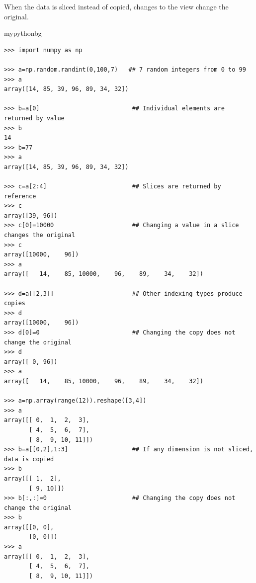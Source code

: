 When the data is sliced instead of copied,
changes to the view change the original.
\begin{tsession}{mypythonbg}
\begin{verbatim}
>>> import numpy as np

>>> a=np.random.randint(0,100,7)   ## 7 random integers from 0 to 99
>>> a
array([14, 85, 39, 96, 89, 34, 32])

>>> b=a[0]                          ## Individual elements are returned by value
>>> b
14
>>> b=77
>>> a
array([14, 85, 39, 96, 89, 34, 32])

>>> c=a[2:4]                        ## Slices are returned by reference
>>> c
array([39, 96])
>>> c[0]=10000                      ## Changing a value in a slice changes the original
>>> c
array([10000,    96])
>>> a
array([   14,    85, 10000,    96,    89,    34,    32])

>>> d=a[[2,3]]                      ## Other indexing types produce copies
>>> d
array([10000,    96])
>>> d[0]=0                          ## Changing the copy does not change the original
>>> d
array([ 0, 96])
>>> a
array([   14,    85, 10000,    96,    89,    34,    32])

>>> a=np.array(range(12)).reshape([3,4])
>>> a
array([[ 0,  1,  2,  3],
       [ 4,  5,  6,  7],
       [ 8,  9, 10, 11]])
>>> b=a[[0,2],1:3]                  ## If any dimension is not sliced, data is copied
>>> b
array([[ 1,  2],
       [ 9, 10]])
>>> b[:,:]=0                        ## Changing the copy does not change the original
>>> b
array([[0, 0],
       [0, 0]])
>>> a
array([[ 0,  1,  2,  3],
       [ 4,  5,  6,  7],
       [ 8,  9, 10, 11]])
\end{verbatim}
\end{tsession}

